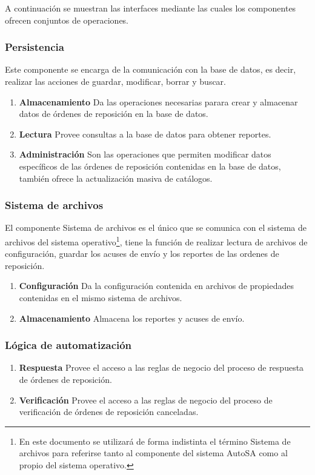 A continuación se muestran las interfaces mediante las cuales los componentes ofrecen conjuntos de operaciones.

\subsubsection{Persistencia}
Este componente se encarga de la comunicación con la base de datos, es decir, realizar las acciones de guardar, modificar, borrar y buscar. 
\begin{enumerate}
\item \textbf{Almacenamiento} Da las operaciones necesarias parara crear y almacenar datos de órdenes de reposición en la base de datos.
\item \textbf{Lectura} Provee consultas a la base de datos para obtener reportes.
\item \textbf{Administración} Son las operaciones que permiten modificar datos específicos de las órdenes de reposición contenidas en la base de datos, también ofrece la actualización masiva de catálogos.
\end{enumerate}

\subsubsection{Sistema de archivos}
El componente Sistema de archivos es el único que se comunica con el sistema de archivos del sistema operativo\footnote{En este documento se utilizará de forma indistinta el término Sistema de archivos para referirse tanto al componente del sistema AutoSA como al propio del sistema operativo.}, tiene la función de realizar lectura de archivos de configuración, guardar los acuses de envío  y los reportes de las ordenes de reposición.
\begin{enumerate}
\item \textbf{Configuración} Da la configuración contenida en archivos de propiedades contenidas en el mismo sistema de archivos.
\item \textbf{Almacenamiento} Almacena los reportes y acuses de envío.
\end{enumerate}

\subsubsection{Lógica de automatización}

\begin{enumerate}
\item \textbf{Respuesta} Provee el acceso a las reglas de negocio del proceso de respuesta de órdenes de reposición.
\item \textbf{Verificación} Provee el acceso a las reglas de negocio del proceso de verificación de órdenes de reposición canceladas.
\end{enumerate}


